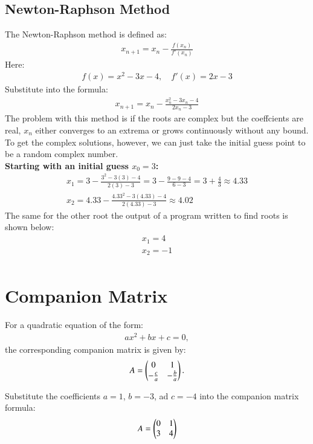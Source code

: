 \documentclass[journal]{IEEEtran}
\begin{document}
\subsection*{ Newton-Raphson Method}
The Newton-Raphson method is defined as:
\begin{align}
    x_{n+1} = x_n - \frac{f(x_n)}{f'(x_n)}
\end{align}
Here:
\begin{align}
    f(x) = x^2 - 3x - 4, \quad f'(x) = 2x - 3
\end{align}
Substitute into the formula:
\begin{align}
    x_{n+1} = x_n - \frac{x_n^2 - 3x_n - 4}{2x_n - 3}
\end{align}
The problem with this method is if the roots are complex but the coeffcients are real, $x_n$ either converges to an extrema or grows continuously without any bound.
	To get the complex solutions, however, we can just take the initial guess point to be a 
	random complex number.\\

\textbf{Starting with an initial guess \( x_0 = 3 \):}
\begin{align}
    x_1 = 3 - \frac{3^2 - 3(3) - 4}{2(3) - 3} = 3 - \frac{9 - 9 - 4}{6 - 3} = 3 + \frac{4}{3} \approx 4.33 \\
    x_2 = 4.33 - \frac{4.33^2 - 3(4.33) - 4}{2(4.33) - 3} \approx 4.02
\end{align}
The same for the other root the output of a program written to find roots is shown below:
	\begin{align}
		x_1 = 4\\
		x_2 = -1\\
	\end{align}

\section*{Companion Matrix}
For a quadratic equation of the form:
\begin{align}
    ax^2 + bx + c = 0,
\end{align}
the corresponding companion matrix is given by:
\begin{align}
    A = 
    \begin{pmatrix}
        0 & 1 \\
        -\frac{c}{a} & -\frac{b}{a}
    \end{pmatrix}.
\end{align}

Substitute the coefficients $a = 1$, $b = -3$, ad $c = -4$ into the companion matrix formula:
\begin{align}
    A = 
    \begin{pmatrix}
        0 & 1 \\
        3 & 4
    \end{pmatrix}
\end{align}
\end{document}
